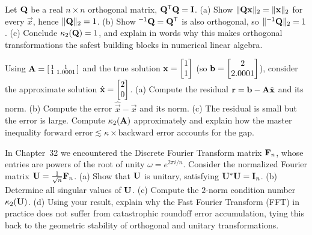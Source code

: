 \begin{exercise}
Let $\mathbf{Q}$ be a real $n\times n$ orthogonal matrix, $\mathbf{Q}^{\mathsf{T}}\mathbf{Q}=\mathbf{I}$.
(a) Show $\lVert\mathbf{Q}\mathbf{x}\rVert_2=\lVert\mathbf{x}\rVert_2$ for every $\vec{x}$, hence
$\lVert\mathbf{Q}\rVert_2=1$. (b) Show $^{-1}{\mathbf{Q}}=\mathbf{Q}^{\mathsf{T}}$ is also orthogonal, so
$\lVert^{-1}{\mathbf{Q}}\rVert_2=1$. (c) Conclude $\kappa_2(\mathbf{Q})=1$, and explain in words why
this makes orthogonal transformations the safest building blocks in numerical linear
algebra.
\end{exercise}

\begin{exercise}
Using $\mathbf{A}=\left[\begin{smallmatrix}1 & 1\\ 1 & 1.0001\end{smallmatrix}\right]$ and
the true solution $\mathbf{x}=\begin{bmatrix}1\\1\end{bmatrix}$ (so $\mathbf{b}=\begin{bmatrix}2\\2.0001\end{bmatrix}$), consider
the approximate solution $\hat{\mathbf{x}}=\begin{bmatrix}2\\0\end{bmatrix}$. (a) Compute the residual
$\mathbf{r}=\mathbf{b}-\mathbf{A}\hat{\mathbf{x}}$ and its norm. (b) Compute the error
$\hat{\vec{x}}-\vec{x}$ and its norm. (c) The residual is small but the error is large.
Compute $\kappa_2(\mathbf{A})$ approximately and explain how the master inequality
$\text{forward error}\lesssim\kappa\times\text{backward error}$ accounts for the gap.
\end{exercise}

\begin{exercise}
In Chapter~32 we encountered the Discrete Fourier Transform matrix $\mathbf{F}_n$, whose
entries are powers of the root of unity $\omega = e^{2\pi i / n}$. Consider the
normalized Fourier matrix $\mathbf{U} = \tfrac{1}{\sqrt{n}}\mathbf{F}_n$.
(a) Show that $\mathbf{U}$ is unitary, satisfying $\mathbf{U}^*\mathbf{U} = \mathbf{I}_n$.
(b) Determine all singular values of $\mathbf{U}$.
(c) Compute the $2$-norm condition number $\kappa_2(\mathbf{U})$.
(d) Using your result, explain why the Fast Fourier Transform (FFT) in practice does
not suffer from catastrophic roundoff error accumulation, tying this back to the geometric
stability of orthogonal and unitary transformations.
\end{exercise}
